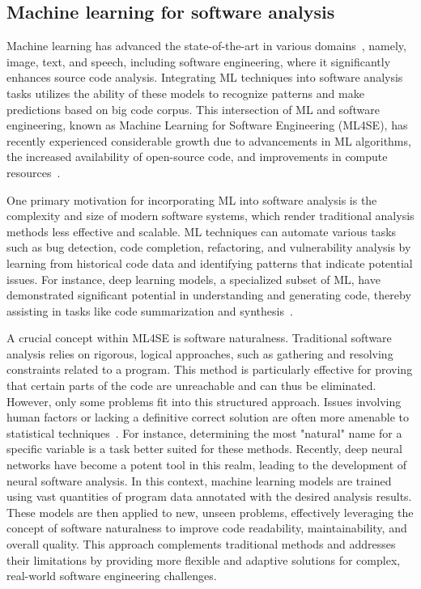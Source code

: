 \subsection{Machine learning for software analysis}
Machine learning has advanced the state-of-the-art in various domains~\cite{dargan2020survey}, namely, image, text, and speech, including software engineering, where it significantly enhances source code analysis. Integrating ML techniques into software analysis tasks utilizes the ability of these models to recognize patterns and make predictions based on big code corpus. This intersection of ML and software engineering, known as Machine Learning for Software Engineering (ML4SE), has recently experienced considerable growth due to advancements in ML algorithms, the increased availability of open-source code, and improvements in compute resources~\cite{sharma2024}.

One primary motivation for incorporating ML into software analysis is the complexity and size of modern software systems, which render traditional analysis methods less effective and scalable. ML techniques can automate various tasks such as bug detection, code completion, refactoring, and vulnerability analysis by learning from historical code data and identifying patterns that indicate potential issues. For instance, deep learning models, a specialized subset of ML, have demonstrated significant potential in understanding and generating code, thereby assisting in tasks like code summarization and synthesis~\cite{le2020deep}.

A crucial concept within ML4SE is software naturalness. Traditional software analysis relies on rigorous, logical approaches, such as gathering and resolving constraints related to a program. This method is particularly effective for proving that certain parts of the code are unreachable and can thus be eliminated. However, only some problems fit into this structured approach. Issues involving human factors or lacking a definitive correct solution are often more amenable to statistical techniques~\cite{pradel2021neural}. For instance, determining the most "natural" name for a specific variable is a task better suited for these methods. Recently, deep neural networks have become a potent tool in this realm, leading to the development of neural software analysis. In this context, machine learning models are trained using vast quantities of program data annotated with the desired analysis results. These models are then applied to new, unseen problems, effectively leveraging the concept of software naturalness to improve code readability, maintainability, and overall quality. This approach complements traditional methods and addresses their limitations by providing more flexible and adaptive solutions for complex, real-world software engineering challenges.

